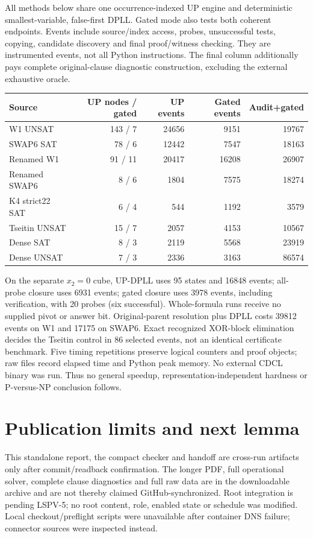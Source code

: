 \documentclass[11pt]{article}
\begin{document}
All methods below share one occurrence-indexed UP engine and deterministic smallest-variable, false-first DPLL. Gated mode also tests both coherent endpoints. Events include source/index access, probes, unsuccessful tests, copying, candidate discovery and final proof/witness checking. They are instrumented events, not all Python instructions. The final column additionally pays complete original-clause diagnostic construction, excluding the external exhaustive oracle.
\begin{center}\small
\begin{tabular}{lrrrr}
\toprule Source&UP nodes / gated&UP events&Gated events&Audit+gated\\\midrule
W1 UNSAT&143 / 7&24656&9151&19767\\
SWAP6 SAT&78 / 6&12442&7547&18163\\
Renamed W1&91 / 11&20417&16208&26907\\
Renamed SWAP6&8 / 6&1804&7575&18274\\
K4 strict22 SAT&6 / 4&544&1192&3579\\
Tseitin UNSAT&15 / 7&2057&4153&10567\\
Dense SAT&8 / 3&2119&5568&23919\\
Dense UNSAT&7 / 3&2336&3163&86574\\\bottomrule
\end{tabular}
\end{center}
On the separate $x_2=0$ cube, UP-DPLL uses 95 states and 16848 events; all-probe closure uses 6931 events; gated closure uses 3978 events, including verification, with 20 probes (six successful). Whole-formula runs receive no supplied pivot or answer bit. Original-parent resolution plus DPLL costs 39812 events on W1 and 17175 on SWAP6. Exact recognized XOR-block elimination decides the Tseitin control in 86 selected events, not an identical certificate benchmark. Five timing repetitions preserve logical counters and proof objects; raw files record elapsed time and Python peak memory. No external CDCL binary was run. Thus no general speedup, representation-independent hardness or P-versus-NP conclusion follows.

\section{Publication limits and next lemma}
This standalone report, the compact checker and handoff are cross-run artifacts only after commit/readback confirmation. The longer PDF, full operational solver, complete clause diagnostics and full raw data are in the downloadable archive and are not thereby claimed GitHub-synchronized. Root integration is pending LSPV-5; no root content, role, enabled state or schedule was modified. Local checkout/preflight scripts were unavailable after container DNS failure; connector sources were inspected instead.
\end{document}

